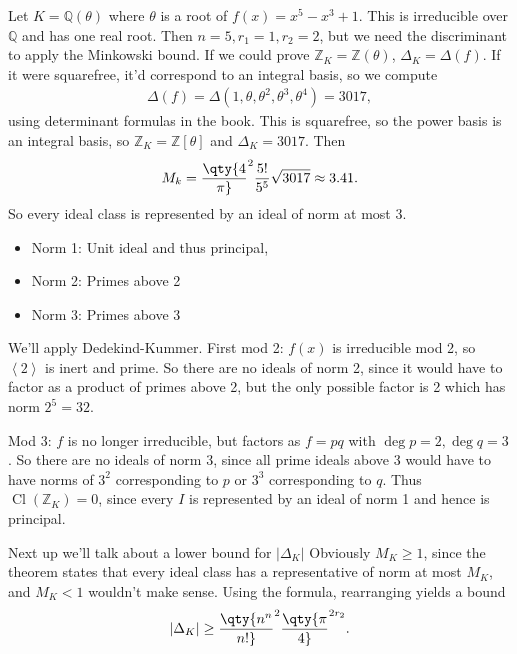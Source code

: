 \begin{example}[?]

Let \(K = {\mathbb{Q}}(\theta)\) where \(\theta\) is a root of
\(f(x) = x^5-x^3 + 1\). This is irreducible over \({\mathbb{Q}}\) and
has one real root. Then \(n=5, r_1 = 1, r_2 = 2\), but we need the
discriminant to apply the Minkowski bound. If we could prove
\({\mathbb{Z}}_K = {\mathbb{Z}}(\theta)\), \({\Delta}_K = {\Delta}(f)\).
If it were squarefree, it'd correspond to an integral basis, so we
compute
\begin{align*}
{\Delta}(f) = {\Delta}(1, \theta, \theta^2, \theta^3, \theta^4) =3017
,\end{align*}
using determinant formulas in the book. This is squarefree, so the power
basis is an integral basis, so \({\mathbb{Z}}_K = {\mathbb{Z}}[\theta]\)
and \({\Delta}_K = 3017\). Then
\begin{align*}
M_k = \qty{4\over \pi}^2 {5! \over 5^5} \sqrt{3017} \approx 3.41
.\end{align*}
So every ideal class is represented by an ideal of norm at most \(3\).

\begin{itemize}
\tightlist
\item
  Norm 1: Unit ideal and thus principal,
\item
  Norm 2: Primes above 2
\item
  Norm 3: Primes above 3
\end{itemize}

We'll apply Dedekind-Kummer. First mod 2: \(f(x)\) is irreducible mod 2,
so \(\left\langle{2}\right\rangle\) is inert and prime. So there are no
ideals of norm 2, since it would have to factor as a product of primes
above 2, but the only possible factor is 2 which has norm \(2^5 =32\).

Mod 3: \(f\) is no longer irreducible, but factors as \(f=pq\) with
\(\deg p = 2,\deg q = 3\). So there are no ideals of norm 3, since all
prime ideals above 3 would have to have norms of \(3^2\) corresponding
to \(p\) or \(3^3\) corresponding to \(q\). Thus
\({ \operatorname{Cl}} ({\mathbb{Z}}_K) = 0\), since every \(I\) is
represented by an ideal of norm 1 and hence is principal.

\end{example}

\begin{remark}

Next up we'll talk about a lower bound for
\({\left\lvert {{\Delta}_K} \right\rvert}\) Obviously \(M_K \geq 1\),
since the theorem states that every ideal class has a representative of
norm at most \(M_K\), and \(M_K< 1\) wouldn't make sense. Using the
formula, rearranging yields a bound
\begin{align*}
{\left\lvert {{\Delta}_K} \right\rvert} \geq \qty{n^n \over n!}^2 \qty{\pi \over 4}^{2r_2}
.\end{align*}

\end{remark}

